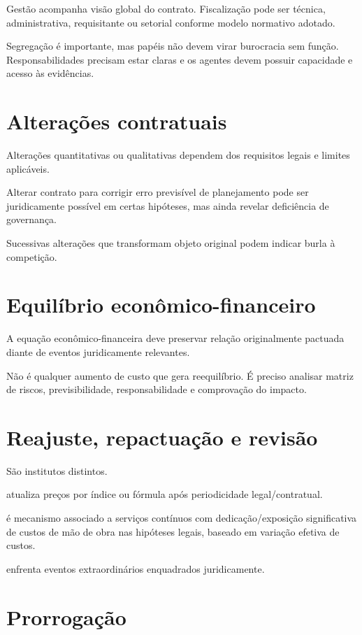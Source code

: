 Gestão acompanha visão global do contrato. Fiscalização pode ser técnica, administrativa, requisitante ou setorial conforme modelo normativo adotado.

Segregação é importante, mas papéis não devem virar burocracia sem função. Responsabilidades precisam estar claras e os agentes devem possuir capacidade e acesso às evidências.

\section{Alterações contratuais}

Alterações quantitativas ou qualitativas dependem dos requisitos legais e limites aplicáveis.

Alterar contrato para corrigir erro previsível de planejamento pode ser juridicamente possível em certas hipóteses, mas ainda revelar deficiência de governança.

Sucessivas alterações que transformam objeto original podem indicar burla à competição.

\section{Equilíbrio econômico-financeiro}

A equação econômico-financeira deve preservar relação originalmente pactuada diante de eventos juridicamente relevantes.

Não é qualquer aumento de custo que gera reequilíbrio. É preciso analisar matriz de riscos, previsibilidade, responsabilidade e comprovação do impacto.

\section{Reajuste, repactuação e revisão}

São institutos distintos.

 atualiza preços por índice ou fórmula após periodicidade legal/contratual.

 é mecanismo associado a serviços contínuos com dedicação/exposição significativa de custos de mão de obra nas hipóteses legais, baseado em variação efetiva de custos.

 enfrenta eventos extraordinários enquadrados juridicamente.

\section{Prorrogação}

